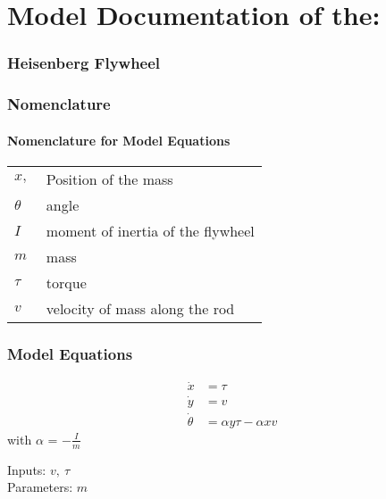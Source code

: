 \documentclass[10pt,a4paper]{article}
\begin{document}
	\part*{Model Documentation of the:}
	\section*{Heisenberg Flywheel} %
	
	
	\section{Nomenclature} %
	\subsection{Nomenclature for Model Equations} %
	
	\begin{tabular}{ll}
		$x, ~$ & Position of the mass \\
		$\theta$ & angle \\
		$I$ & moment of inertia of the flywheel \\
		$m$ & mass \\
		$\tau$ & torque \\
		$v$ & velocity of mass along the rod	
	\end{tabular}

	
	
	\section{Model Equations} %
	
	\begin{subequations}
	\begin{align}
		\dot{x} &= \tau 	\\ 
		\dot{y} &=  v	\\
		\dot{\theta} &= \alpha y \tau - \alpha x v   
	\end{align}
	\end{subequations}
	with $\alpha$ = $-\frac{I}{m}$

	\noindent
	Inputs: $v,~\tau$ 
	\\
	Parameters: $m$ %
	
\end{document}
